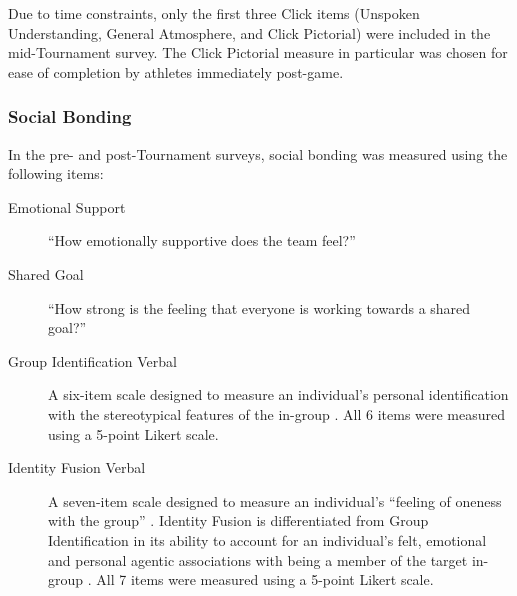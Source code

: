 \documentclass[12pt]{report}
\begin{document}
Due to time constraints, only the first three Click items (Unspoken Understanding, General Atmosphere, and Click Pictorial) were included in the mid-Tournament survey. The Click Pictorial measure in particular was chosen for ease of completion by athletes immediately post-game. \\

    \subsubsection{Social Bonding}

In the pre- and post-Tournament surveys, social bonding was measured using the following items:
\begin{description}
  \item [Emotional Support] ``How emotionally supportive does the team feel?''
  \item [Shared Goal] ``How strong is the feeling that everyone is working towards a shared goal?''
  \item [Group Identification Verbal] A six-item scale designed to measure an individual's personal identification with the stereotypical features of the in-group  \citep{Mael1992}.  All 6 items were measured using a 5-point Likert scale.


\item [Identity Fusion Verbal] A seven-item scale designed to measure an individual's ``feeling of oneness with the group'' \citep{Swann2009}.  Identity Fusion is differentiated from Group Identification in its ability to account for an individual's felt, emotional and personal agentic associations with being a member of the target in-group \citep{Swann2012a}.  All 7 items were measured using a 5-point Likert scale.



\end{description}
\end{document}
